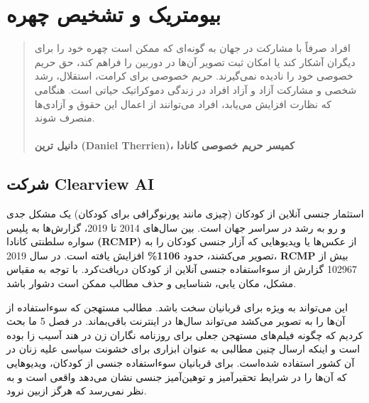 

\chapter{بیومتریک و تشخیص چهره}
\label{ch:بیومتریک و تشخیص چهره}


\begin{quote}
    افراد صرفاً با مشارکت در جهان به گونه‌ای که ممکن است چهره خود را برای دیگران آشکار کند یا امکان ثبت تصویر آن‌ها در دوربین را فراهم کند، حق حریم خصوصی خود را نادیده نمی‌گیرند.
    حریم خصوصی برای کرامت، استقلال، رشد شخصی و مشارکت آزاد و آزاد افراد در زندگی دموکراتیک حیاتی است.
    هنگامی که نظارت افزایش می‌یابد، افراد می‌توانند از اعمال این حقوق و آزادی‌ها منصرف شوند.
    \\\\
    \textbf{دانیل ترین \textenglish{\textbf{(Daniel Therrien)}}، کمیسر حریم خصوصی کانادا}
    \newline
\end{quote}


{
\section*{شرکت \textenglish{\textbf{Clearview AI}}}
\label{sec:شرکت Clearview AI}
استثمار جنسی آنلاین از کودکان (چیزی مانند پورنوگرافی برای کودکان) یک مشکل جدی و رو به رشد در سراسر جهان است. بین سال‌های 2014 تا 2019، گزارش‌ها به پلیس سواره سلطنتی کانادا \textenglish{\textbf{(RCMP)}} از عکس‌ها یا ویدیوهایی که آزار جنسی کودکان را به تصویر می‌کشند، حدود \textenglish{\textbf{1106\%}}  افزایش یافته است. در سال 2019، \textenglish{\textbf{RCMP}} بیش از 102967 گزارش از سوء‌استفاده جنسی آنلاین از کودکان دریافت‌کرد. با توجه به مقیاس مشکل، مکان یابی، شناسایی و حذف مطالب ممکن است دشوار باشد.
}

این می‌تواند به ویژه برای قربانیان سخت باشد.
مطالب مستهجن که سوء‌استفاده از آن‌ها را به تصویر می‌کشد می‌تواند سال‌ها در اینترنت باقی‌بماند.
در فصل 5 ما بحث کردیم که چگونه فیلم‌های مستهجن جعلی برای روزنامه نگاران زن در هند آسیب زا بوده است و اینکه ارسال چنین مطالبی به عنوان ابزاری برای خشونت سیاسی علیه زنان در آن کشور استفاده شده‌است.
برای قربانیان سوء‌استفاده جنسی از کودکان، ویدیوهایی که آن‌ها را در شرایط تحقیرآمیز و توهین‌آمیز جنسی نشان می‌دهد واقعی است و به نظر نمی‌رسد که هرگز ازبین نرود.

